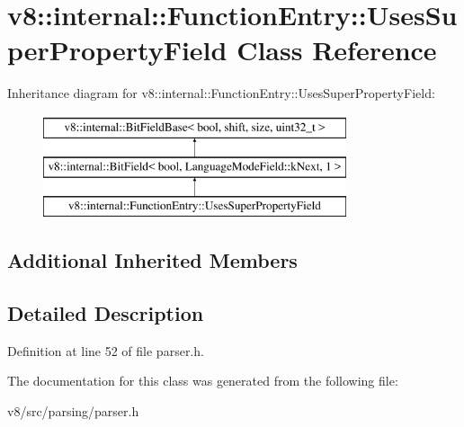 \hypertarget{classv8_1_1internal_1_1FunctionEntry_1_1UsesSuperPropertyField}{}\section{v8\+:\+:internal\+:\+:Function\+Entry\+:\+:Uses\+Super\+Property\+Field Class Reference}
\label{classv8_1_1internal_1_1FunctionEntry_1_1UsesSuperPropertyField}
Inheritance diagram for v8\+:\+:internal\+:\+:Function\+Entry\+:\+:Uses\+Super\+Property\+Field\+:\begin{figure}[H]
\begin{center}
\leavevmode
\includegraphics[height=3.000000cm]{classv8_1_1internal_1_1FunctionEntry_1_1UsesSuperPropertyField}
\end{center}
\end{figure}
\subsection*{Additional Inherited Members}


\subsection{Detailed Description}


Definition at line 52 of file parser.\+h.



The documentation for this class was generated from the following file\+:\begin{DoxyCompactItemize}
\item 
v8/src/parsing/parser.\+h\end{DoxyCompactItemize}
